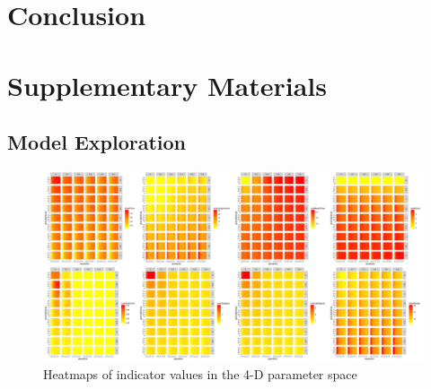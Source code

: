 \documentclass[fleqn,10pt]{wlscirep}
\begin{document}
{%
\section*{Conclusion}









%








\newpage


\section*{Supplementary Materials}


\subsection*{Model Exploration}


\begin{figure}
\hspace{-2cm}\includegraphics[width=1.3\textwidth]{figures/heatmap_indics}
\caption{Heatmaps of indicator values in the 4-D parameter space}
\label{fig:heatmap}
\end{figure}


}
\end{document}
